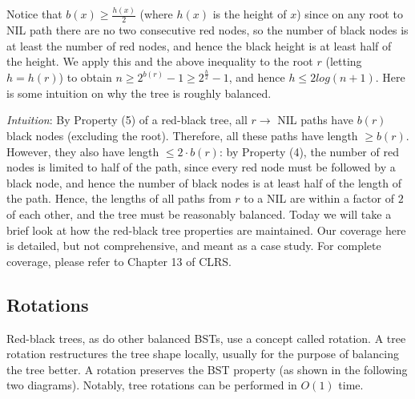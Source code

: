 \documentclass [12pt]{article}
\begin{document}
Notice that $b(x) \geq \frac{h(x)}{2}$ (where $h(x)$ is the height of $x$) since on any root to NIL path there are no two consecutive red nodes, so the number of black nodes is at least the number of red nodes, and hence the black height is at least half of the height. We apply this and the above inequality to the root $r$ (letting $h = h(r )$) to obtain $n \geq 2^{b(r)} - 1 \geq 2^{\frac{h}{2}} - 1$, and hence $h \leq 2 log(n + 1)$. Here is some intuition on why the tree is roughly balanced.
 
\textit{Intuition}: By Property (5) of a red-black tree, all $r \to$ NIL paths have $b(r)$ black nodes (excluding the root). Therefore, all these paths have length $\geq b(r)$. However, they also have length $\leq 2 \cdot b(r)$: by Property (4), the number of red nodes is limited to half of the path, since every red node must be followed by a black node, and hence the number of black nodes is at least half of the length of the path. Hence, the lengths of all paths from $r$ to a NIL are within a factor of $2$ of each other, and the tree must be reasonably balanced. Today we will take a brief look at how the red-black tree properties are maintained. Our coverage here is detailed, but not comprehensive, and meant as a case study. For complete coverage, please refer to Chapter 13 of CLRS.

\subsection{Rotations} Red-black trees, as do other balanced BSTs, use a concept called rotation. A tree rotation restructures the tree shape locally, usually for the purpose of balancing the tree better. A rotation preserves the BST property (as shown in the following two diagrams). Notably, tree rotations can be performed in $O(1)$ time.

\begin{center}
\end{center}
\end{document}
